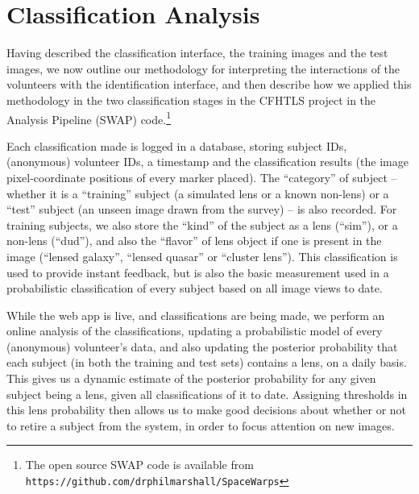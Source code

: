 \documentclass[useAMS,usenatbib,a4paper]{mn2e}
\begin{document}
\section{Classification Analysis}
\label{sec:swap}

Having described the classification interface, the training images and the
test images,  we now outline our methodology for interpreting the interactions
of the volunteers with the identification interface, and then describe how we
applied this methodology in the two classification stages in the CFHTLS
project in the \SW Analysis Pipeline (SWAP) code.\footnote{The open source
SWAP code is available from
\texttt{https://github.com/drphilmarshall/SpaceWarps}}

Each classification made is logged in a database, storing subject IDs,
(anonymous) volunteer IDs, a timestamp and the classification results (the image
pixel-coordinate positions of every marker placed).  The ``category'' of subject --
whether it is a ``training'' subject (a simulated lens or a known non-lens) or a
``test'' subject (an unseen image drawn from the survey) -- is also recorded.
For training subjects, we also store the ``kind'' of the subject as
a lens (``sim''), or a non-lens (``dud''), and also the ``flavor'' of lens
object if one is present in the image (``lensed galaxy'', ``lensed quasar'' or
``cluster lens'').  This classification is used to provide instant feedback, but
is also the basic measurement used in a probabilistic classification of every
subject based on all image views to date.

While the \SW web app is live, and classifications are being made, we perform an
online analysis of the classifications,  updating a probabilistic model of every
(anonymous) volunteer's data, and also updating the posterior probability that
each subject (in both the training and test sets) contains a lens, on a daily
basis. This gives us a dynamic estimate of the posterior probability for  any
given  subject being a lens, given all classifications of it to date. Assigning
thresholds in this lens probability then allows us to make good decisions about
whether or not to retire a subject from the system, in order to focus attention
on new images.
\end{document}
